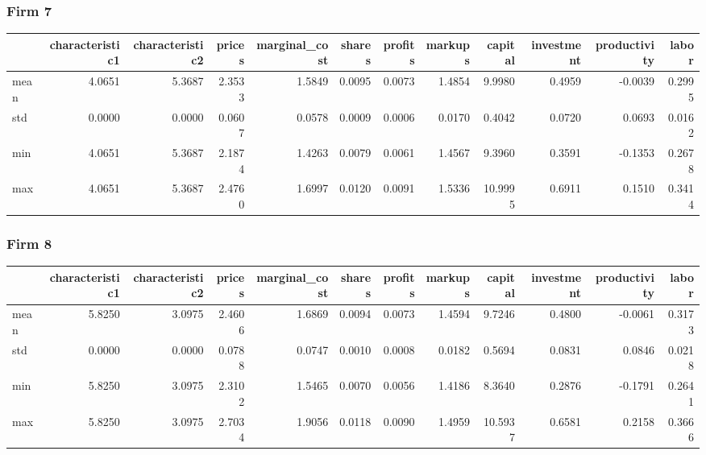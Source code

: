  \subsubsection*{Firm 7}
\begin{tabular}{lrrrrrrrrrrr}
\toprule
{} &  characteristic1 &  characteristic2 &  prices &  marginal\_cost &  shares &  profits &  markups &  capital &  investment &  productivity &  labor \\
\midrule
mean &           4.0651 &           5.3687 &  2.3533 &         1.5849 &  0.0095 &   0.0073 &   1.4854 &   9.9980 &      0.4959 &       -0.0039 & 0.2995 \\
std  &           0.0000 &           0.0000 &  0.0607 &         0.0578 &  0.0009 &   0.0006 &   0.0170 &   0.4042 &      0.0720 &        0.0693 & 0.0162 \\
min  &           4.0651 &           5.3687 &  2.1874 &         1.4263 &  0.0079 &   0.0061 &   1.4567 &   9.3960 &      0.3591 &       -0.1353 & 0.2678 \\
max  &           4.0651 &           5.3687 &  2.4760 &         1.6997 &  0.0120 &   0.0091 &   1.5336 &  10.9995 &      0.6911 &        0.1510 & 0.3414 \\
\bottomrule
\end{tabular}


 \subsubsection*{Firm 8}
\begin{tabular}{lrrrrrrrrrrr}
\toprule
{} &  characteristic1 &  characteristic2 &  prices &  marginal\_cost &  shares &  profits &  markups &  capital &  investment &  productivity &  labor \\
\midrule
mean &           5.8250 &           3.0975 &  2.4606 &         1.6869 &  0.0094 &   0.0073 &   1.4594 &   9.7246 &      0.4800 &       -0.0061 & 0.3173 \\
std  &           0.0000 &           0.0000 &  0.0788 &         0.0747 &  0.0010 &   0.0008 &   0.0182 &   0.5694 &      0.0831 &        0.0846 & 0.0218 \\
min  &           5.8250 &           3.0975 &  2.3102 &         1.5465 &  0.0070 &   0.0056 &   1.4186 &   8.3640 &      0.2876 &       -0.1791 & 0.2641 \\
max  &           5.8250 &           3.0975 &  2.7034 &         1.9056 &  0.0118 &   0.0090 &   1.4959 &  10.5937 &      0.6581 &        0.2158 & 0.3666 \\
\bottomrule
\end{tabular}



